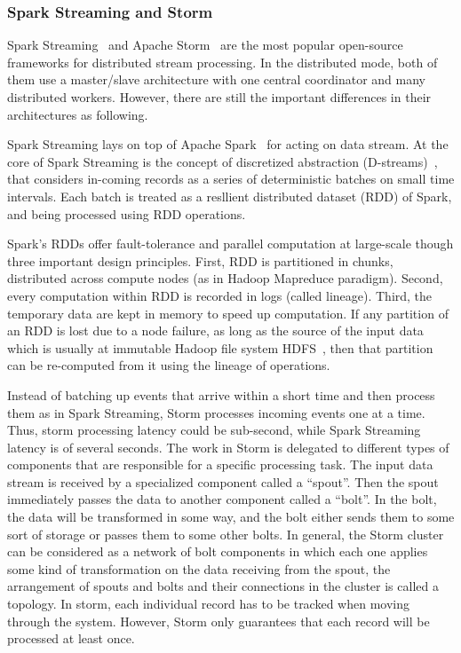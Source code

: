 \documentclass{acm_proc_article-sp}
\begin{document}
\subsubsection{Spark Streaming and Storm}

Spark Streaming~\cite{learningsparkbook,sparkstreamingweb} and Apache Storm~\cite{stormappliedbook,apachestormweb} are the most popular open-source frameworks for distributed stream processing. In the distributed mode, both of them use a master/slave architecture with one central coordinator and many distributed workers. However, there are still the important differences in their architectures as following.

Spark Streaming lays on top of Apache Spark~\cite{Zaharia:2010:Spark} for acting on data stream.
 At the core of Spark Streaming is the concept of discretized abstraction (D-streams)~\cite{Zaharia:2013:Discretized,Zaharia:2012:Discretized}, that considers in-coming records as a series of deterministic batches on small time intervals. Each batch is treated as a resllient distributed dataset (RDD) of Spark, and being processed using RDD operations. 

Spark's RDDs offer fault-tolerance and parallel computation at large-scale though three important design principles. First, RDD is partitioned in chunks, distributed across compute nodes (as in Hadoop Mapreduce paradigm). Second, every computation within RDD is recorded in logs (called lineage). Third, the temporary data are kept in memory to speed up computation. If any partition of an RDD is lost due to a node failure, as long as the source of the input data which is usually at immutable Hadoop file system HDFS~\cite{shvachko2010hadoop}, then that partition can be re-computed from it using the lineage of operations.

Instead of batching up events that arrive within a short time and then process them as in Spark Streaming, Storm processes incoming events one at a time. Thus, storm processing latency could be sub-second, while Spark Streaming latency is of several seconds. The work in Storm is delegated to different types of components that are responsible for a specific processing task. The input data stream is received by a specialized component called a ``spout''. Then the spout immediately passes the data to another component called a ``bolt''. In the bolt, the data will be transformed in some way, and the bolt either sends them to some sort of storage or passes them to some other bolts. In general, the Storm cluster can be considered as a network of bolt components in which each one applies some kind of transformation on the data receiving from the spout, the arrangement of spouts and bolts and their connections in the cluster is called a topology. In storm, each individual record has to be tracked when moving through the system. However, Storm only guarantees that each record will be processed at least once.
\end{document}

